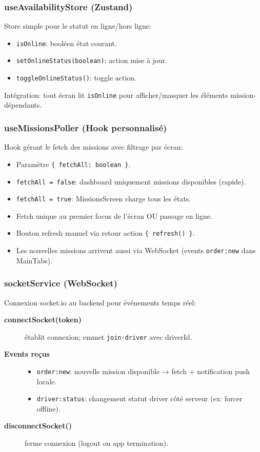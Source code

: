 \subsubsection{useAvailabilityStore (Zustand)}

Store simple pour le statut en ligne/hors ligne:

\begin{itemize}
    \item \texttt{isOnline}: booléen état courant.
    \item \texttt{setOnlineStatus(boolean)}: action mise à jour.
    \item \texttt{toggleOnlineStatus()}: toggle action.
\end{itemize}

Intégration: tout écran lit \texttt{isOnline} pour afficher/masquer les éléments mission-dépendants.

\subsubsection{useMissionsPoller (Hook personnalisé)}

Hook gérant le fetch des missions avec filtrage par écran:

\begin{itemize}
    \item Paramètre \texttt{\{ fetchAll: boolean \}}.
    \item \texttt{fetchAll = false}: dashboard uniquement missions disponibles (rapide).
    \item \texttt{fetchAll = true}: MissionsScreen charge tous les états.
    \item Fetch unique au premier focus de l'écran OU passage en ligne.
    \item Bouton refresh manuel via retour action \texttt{\{ refresh() \}}.
    \item Les nouvelles missions arrivent aussi via WebSocket (events \texttt{order:new} dans MainTabs).
\end{itemize}

\subsubsection{socketService (WebSocket)}

Connexion socket.io au backend pour événements temps réel:

\begin{description}
    \item[\textbf{connectSocket(token)}] établit connexion; emmet \texttt{join-driver} avec driverId.
    \item[\textbf{Events reçus}]
    \begin{itemize}
        \item \texttt{order:new}: nouvelle mission disponible → fetch + notification push locale.
        \item \texttt{driver:status}: changement statut driver côté serveur (ex: forcer offline).
    \end{itemize}
    \item[\textbf{disconnectSocket()}] ferme connexion (logout ou app termination).
\end{description}

